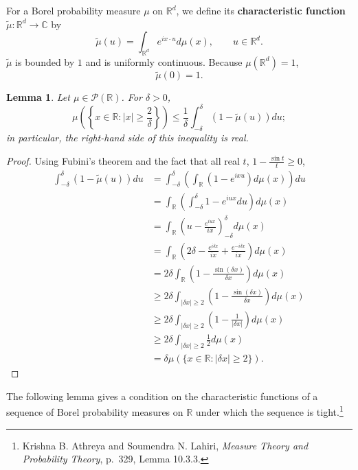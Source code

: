 \documentclass{article}
\newtheorem{lemma}[theorem]{Lemma}
\theoremstyle{definition}
\begin{document}
For a Borel probability measure $\mu$ on $\mathbb{R}^d$, we define its \textbf{characteristic function} 
$\tilde{\mu}:\mathbb{R}^d \to \mathbb{C}$ by
\[
\tilde{\mu}(u) = \int_{\mathbb{R}^d} e^{ix\cdot u} d\mu(x), \qquad u \in \mathbb{R}^d.
\]
$\tilde{\mu}$ is  bounded by $1$ and is uniformly  continuous.
Because $\mu(\mathbb{R}^d)=1$,
\[
\tilde{\mu}(0) = 1.
\]


\begin{lemma}
Let $\mu \in \mathscr{P}(\mathbb{R})$. For  $\delta>0$, 
\[
\mu\left(\left\{x \in \mathbb{R}: |x| \geq \frac{2}{\delta} \right\} \right)
\leq \frac{1}{\delta} \int_{-\delta}^\delta (1-\tilde{\mu}(u)) du;
\]
in particular, the right-hand side of this inequality is real.
\label{twodelta}
\end{lemma}
\begin{proof}
Using Fubini's theorem and the fact that
all real $t$, $1-\frac{\sin t}{t} \geq 0$, 
\begin{align*}
\int_{-\delta}^\delta (1-\tilde{\mu}(u)) du&=\int_{-\delta}^\delta \left( \int_{\mathbb{R}} (1-e^{ixu}) d\mu(x)\right) du\\
&=\int_{\mathbb{R}} \left(\int_{-\delta}^\delta 1-e^{iu x} du\right) d\mu(x)\\
&=\int_{\mathbb{R}} \left(u - \frac{e^{iux}}{ix}\right)_{-\delta}^\delta d\mu(x)\\
&=\int_{\mathbb{R}} \left(2\delta - \frac{e^{i\delta x}}{ix}+\frac{e^{-i\delta x}}{ix}\right) d\mu(x)\\
&=2\delta \int_{\mathbb{R}} \left(1 -  \frac{\sin(\delta x)}{\delta x} \right) d\mu(x)\\
&\geq 2\delta \int_{|\delta x| \geq 2}  \left(1 -  \frac{\sin(\delta x)}{\delta x} \right) d\mu(x)\\
&\geq 2\delta \int_{|\delta x| \geq 2}  \left(1 -  \frac{1}{|\delta x|} \right) d\mu(x)\\
&\geq 2\delta \int_{|\delta x| \geq 2} \frac{1}{2} d\mu(x)\\
&=\delta \mu(\{x \in \mathbb{R}: |\delta x| \geq 2\}).
\end{align*}
\end{proof}


The following lemma gives a condition on the characteristic functions of a sequence of Borel probability
measures on $\mathbb{R}$ under which the sequence is tight.\footnote{Krishna B. Athreya and Soumendra N. Lahiri,
{\em Measure Theory and Probability Theory}, p.~329, Lemma 10.3.3.}
\end{document}
